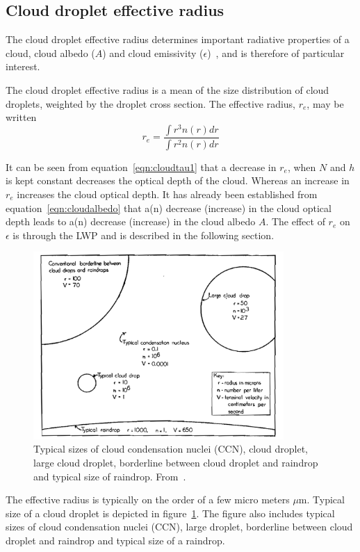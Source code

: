 \subsection{Cloud droplet effective radius}
The cloud droplet effective radius determines important radiative properties of a cloud, cloud albedo ($A$) and cloud emissivity ($\epsilon$)~\citep{Hansen1974}, and is therefore of particular interest. 

The cloud droplet effective radius is a mean of the size distribution of cloud droplets, weighted by the droplet cross section. The effective radius, $r_e$, may be written
\begin{equation}
r_e = \frac{\int r^3 n(r) dr}{\int r^2 n(r) dr}
\label{eqn:re}
\end{equation}

It can be seen from equation~\ref{eqn:cloudtau1} that a decrease in $r_e$, when $N$ and $h$ is kept constant decreases the optical depth of the cloud. Whereas an increase in $r_e$ increases the cloud optical depth. It has already been established from equation~\ref{eqn:cloudalbedo} that a(n) decrease (increase) in the cloud optical depth leads to a(n) decrease (increase) in the cloud albedo $A$. The effect of $r_e$ on $\epsilon$ is through the LWP and is described in the following section.

\begin{figure}
\centering
\includegraphics[width=0.85\textwidth]{theory/dropletsize.png}
\caption{Typical sizes of cloud condensation nuclei (CCN), cloud droplet, large cloud droplet, borderline between cloud droplet and raindrop and typical size of raindrop.%
 From~\citep{McDonald1958}.}
\label{fig:dropletsize}
\end{figure}
The effective radius is typically on the order of a few micro meters $\mu\text{m}$. Typical size of a cloud droplet is depicted in figure~\ref{fig:dropletsize}. The figure also includes typical sizes of cloud condensation nuclei (CCN), large droplet, borderline between cloud droplet and raindrop and typical size of a raindrop.


